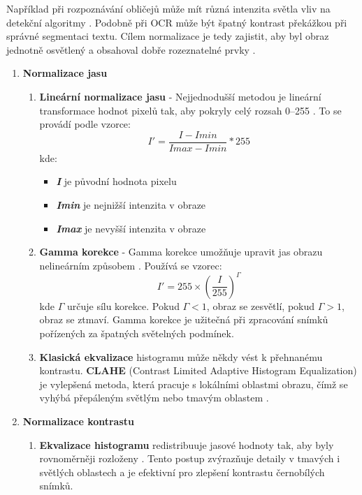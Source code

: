 \documentclass[FM,BP,CZ]{tulthesis}
\begin{document}
Například při rozpoznávání obličejů může mít různá intenzita světla vliv na detekční algoritmy \cite{wang2021survey}. Podobně při OCR může být špatný kontrast překážkou při správné segmentaci textu. Cílem normalizace je tedy zajistit, aby byl obraz jednotně osvětlený a obsahoval dobře rozeznatelné prvky \cite{gonzalez2018digital}.
\begin{enumerate}
    \item \textbf{Normalizace jasu}
    \begin{enumerate}
        \item \textbf{Lineární normalizace jasu}
        - Nejjednodušší metodou je lineární transformace hodnot pixelů tak, aby pokryly celý rozsah 0–255 \cite{gonzalez2018digital}. To se provádí podle vzorce:
        \begin{equation}
            I' = \frac{I - Imin}{Imax - Imin} * 255
        \end{equation}
        kde: 
        \begin{itemize}
            \item \textbf{\textit{I}} je původní hodnota pixelu
            \item \textbf{\textit{Imin}} je nejnižší intenzita v obraze
            \item \textbf{\textit{Imax}} je nevyšší intenzita v obraze
        \end{itemize}
        \item \textbf{Gamma korekce}
        - Gamma korekce umožňuje upravit jas obrazu nelineárním způsobem \cite{gonzalez2018digital}. Používá se vzorec:
        \begin{equation}
            I' = 255 \times \left( \frac{I}{255} \right)^{\Gamma}
        \end{equation}
        kde \( \Gamma \) určuje sílu korekce. Pokud \( \Gamma < 1 \), obraz se zesvětlí, pokud \( \Gamma > 1 \), obraz se ztmaví.   
        \newline Gamma korekce je užitečná při zpracování snímků pořízených za špatných světelných podmínek.
        \item \textbf{Klasická ekvalizace} histogramu může někdy vést k přehnanému kontrastu. \textbf{CLAHE} (Contrast Limited Adaptive Histogram Equalization) je vylepšená metoda, která pracuje s lokálními oblastmi obrazu, čímž se vyhýbá přepáleným světlým nebo tmavým oblastem \cite{gonzalez2018digital}.
    \end{enumerate}
    \item \textbf{Normalizace kontrastu}
    \begin{enumerate}
        \item \textbf{Ekvalizace histogramu} redistribuuje jasové hodnoty tak, aby byly rovnoměrněji rozloženy \cite{gonzalez2018digital}. Tento postup zvýrazňuje detaily v tmavých i světlých oblastech a je efektivní pro zlepšení kontrastu černobílých snímků.


\end{enumerate}
\end{enumerate}
\end{document}
